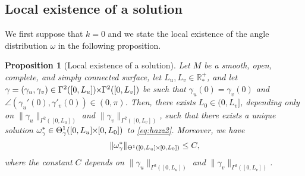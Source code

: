 \documentclass{article}
\newcommand{\PLH}{{\mkern-1mu\times\mkern-1mu}}
\newcommand{\Times}{\PLH}
\newcommand{\R}{\mathbb{R}}
\newcommand{\surf}{M}
\newtheorem{proposition}[theorem]{Proposition}
\theoremstyle{remark}
\theoremstyle{prpart}
\begin{document}
\subsection{Local existence of a solution}\label{subsubsec:local-exist}
We first suppose that $k = 0$ and we state the local existence of the angle distribution $\omega$ in the following proposition.
\begin{proposition}[Local existence of a solution]  \label{prop1}
  Let $\surf$ be a smooth, open, complete, and simply connected surface, let $L_u,L_v\in\R^+_\ast$, and let $\gamma=(\gamma_u,\gamma_v)\in\Gamma^{2}([0,L_u])\Times\Gamma^{2}([0,L_v])$ be such that $\gamma_u(0)=\gamma_v(0)$ and $\angle(\gamma_u'(0),\gamma'_v(0))\in(0,\pi)$. Then, there exists $L_0\in(0,L_v]$, depending only on $\|\gamma_u\|_{\Gamma^2([0,L_u])}$ and $\|\gamma_v\|_{\Gamma^2([0,L_v])}$, such that there exists a unique solution $\omega^\ast_\gamma \in \Theta^1_{\gamma}([0,L_u]\Times[0,L_0])$ to \eqref{eq:hazz2}. Moreover, we have
\begin{equation}\label{eq:borne-0}
\|\omega^\ast_\gamma\|_{\Theta^1([0,L_u]\Times[0,L_0])}\leq C,
\end{equation}
where the constant $C$ depends on $\|\gamma_u\|_{\Gamma^2([0,L_u])}$ and $\|\gamma_v\|_{\Gamma^2([0,L_v])}$.
\end{proposition}
\end{document}

